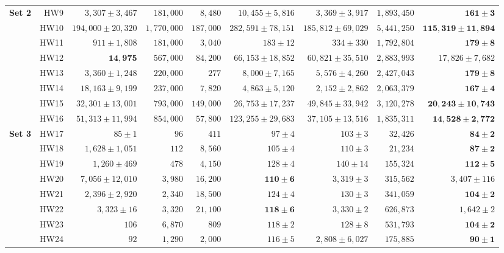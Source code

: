 \documentclass[pdflatex]{sn-jnl}
\begin{document}
\begin{table}
\begin{tabular}{l|r|r|r|r|r|r|r|r}
\multirow{8}{*}{\textbf{Set 2}}
& HW9  & $3,307 \pm 3,467$ & $181,000$ & $8,480$ & $10,455 \pm 5,816$ & $3,369 \pm 3,917$ & $1,893,450$ & $\mathbf{161 \pm 3}$ \\
& HW10 & $194,000 \pm 20,320$ & $1,770,000$ & $187,000$ & $282,591 \pm 78,151$ & $185,812 \pm 69,029$ & $5,441,250$ & $\mathbf{115,319 \pm 11,894}$ \\
& HW11 & $911 \pm 1,808$ & $181,000$ & $3,040$ & $183 \pm 12$ & $334 \pm 330$ & $1,792,804$ & $\mathbf{179 \pm 8}$ \\
& HW12 & $\mathbf{14,975}$ & $567,000$ & $84,200$ & $66,153 \pm 18,852$ & $60,821 \pm 35,510$ & $2,883,993$ & $17,826 \pm 7,682$ \\
& HW13 & $3,360 \pm 1,248$ & $220,000$ & $277$ & $8,000 \pm 7,165$ & $5,576 \pm 4,260$ & $2,427,043$ & $\mathbf{179 \pm 8}$ \\
& HW14 & $18,163 \pm 9,199$ & $237,000$ & $7,820$ & $4,863 \pm 5,120$ & $2,152 \pm 2,862$ & $2,063,379$ & $\mathbf{167 \pm 4}$ \\
& HW15 & $32,301 \pm 13,001$ & $793,000$ & $149,000$ & $26,753 \pm 17,237$ & $49,845 \pm 33,942$ & $3,120,278$ & $\mathbf{20,243 \pm 10,743}$ \\
& HW16 & $51,313 \pm 11,994$ & $854,000$ & $57,800$ & $123,255 \pm 29,683$ & $37,105 \pm 13,516$ & $1,835,311$ & $\mathbf{14,528 \pm 2,772}$ \\
\hline

\multirow{8}{*}{\textbf{Set 3}}
& HW17 & $85 \pm 1$ & $96$ & $411$ & $97 \pm 4$ & $103 \pm 3$ & $32,426$ & $\mathbf{84 \pm 2}$ \\
& HW18 & $1,628 \pm 1,051$ & $112$ & $8,560$ & $105 \pm 4$ & $110 \pm 3$ & $21,234$ & $\mathbf{87 \pm 2}$ \\
& HW19 & $1,260 \pm 469$ & $478$ & $4,150$ & $128 \pm 4$ & $140 \pm 14$ & $155,324$ & $\mathbf{112 \pm 5}$ \\
& HW20 & $7,056 \pm 12,010$ & $3,980$ & $16,200$ & $\mathbf{110 \pm 6}$ & $3,319 \pm 3$ & $315,562$ & $3,407 \pm 116$ \\
& HW21 & $2,396 \pm 2,920$ & $2,340$ & $18,500$ & $124 \pm 4$ & $130 \pm 3$ & $341,059$ & $\mathbf{104 \pm 2}$ \\
& HW22 & $3,323 \pm 16$ & $3,320$ & $21,100$ & $\mathbf{118 \pm 6}$ & $3,330 \pm 2$ & $626,873$ & $1,642 \pm 2$ \\
& HW23 & $106$ & $6,870$ & $809$ & $118 \pm 2$ & $128 \pm 8$ & $531,793$ & $\mathbf{104 \pm 2}$ \\
& HW24 & $92$ & $1,290$ & $2,000$ & $116 \pm 5$ & $2,808 \pm 6,027$ & $175,885$ & $\mathbf{90 \pm 1}$ \\
\hline


\end{tabular}
\end{table}
\end{document}
